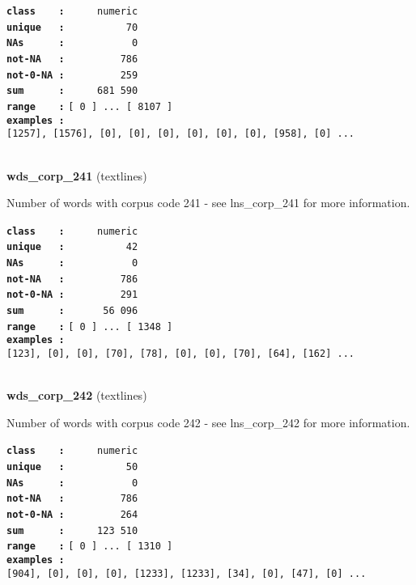 \documentclass[]{article}
\begin{document}
\textbf{\texttt{class\ \ \ \ :}} \texttt{~~~~~numeric}\\
\textbf{\texttt{unique\ \ \ :}} \texttt{~~~~~~~~~~70}\\
\textbf{\texttt{NAs\ \ \ \ \ \ :}} \texttt{~~~~~~~~~~~0}\\
\textbf{\texttt{not-NA\ \ \ :}} \texttt{~~~~~~~~~786}\\
\textbf{\texttt{not-0-NA\ :}} \texttt{~~~~~~~~~259}\\
\textbf{\texttt{sum\ \ \ \ \ \ :}} \texttt{~~~~~681~590}\\
\textbf{\texttt{range\ \ \ \ :}}
\texttt{{[}\ 0\ {]}\ ...\ {[}\ 8107\ {]}}\\
\textbf{\texttt{examples\ :}}
\texttt{{[}1257{]},\ {[}1576{]},\ {[}0{]},\ {[}0{]},\ {[}0{]},\ {[}0{]},\ {[}0{]},\ {[}0{]},\ {[}958{]},\ {[}0{]}\ ...}\\

~

\textbf{wds\_corp\_241} (textlines)

Number of words with corpus code 241 - see lns\_corp\_241 for more
information.

\textbf{\texttt{class\ \ \ \ :}} \texttt{~~~~~numeric}\\
\textbf{\texttt{unique\ \ \ :}} \texttt{~~~~~~~~~~42}\\
\textbf{\texttt{NAs\ \ \ \ \ \ :}} \texttt{~~~~~~~~~~~0}\\
\textbf{\texttt{not-NA\ \ \ :}} \texttt{~~~~~~~~~786}\\
\textbf{\texttt{not-0-NA\ :}} \texttt{~~~~~~~~~291}\\
\textbf{\texttt{sum\ \ \ \ \ \ :}} \texttt{~~~~~~56~096}\\
\textbf{\texttt{range\ \ \ \ :}}
\texttt{{[}\ 0\ {]}\ ...\ {[}\ 1348\ {]}}\\
\textbf{\texttt{examples\ :}}
\texttt{{[}123{]},\ {[}0{]},\ {[}0{]},\ {[}70{]},\ {[}78{]},\ {[}0{]},\ {[}0{]},\ {[}70{]},\ {[}64{]},\ {[}162{]}\ ...}\\

~

\textbf{wds\_corp\_242} (textlines)

Number of words with corpus code 242 - see lns\_corp\_242 for more
information.

\textbf{\texttt{class\ \ \ \ :}} \texttt{~~~~~numeric}\\
\textbf{\texttt{unique\ \ \ :}} \texttt{~~~~~~~~~~50}\\
\textbf{\texttt{NAs\ \ \ \ \ \ :}} \texttt{~~~~~~~~~~~0}\\
\textbf{\texttt{not-NA\ \ \ :}} \texttt{~~~~~~~~~786}\\
\textbf{\texttt{not-0-NA\ :}} \texttt{~~~~~~~~~264}\\
\textbf{\texttt{sum\ \ \ \ \ \ :}} \texttt{~~~~~123~510}\\
\textbf{\texttt{range\ \ \ \ :}}
\texttt{{[}\ 0\ {]}\ ...\ {[}\ 1310\ {]}}\\
\textbf{\texttt{examples\ :}}
\texttt{{[}904{]},\ {[}0{]},\ {[}0{]},\ {[}0{]},\ {[}1233{]},\ {[}1233{]},\ {[}34{]},\ {[}0{]},\ {[}47{]},\ {[}0{]}\ ...}\\
\end{document}
